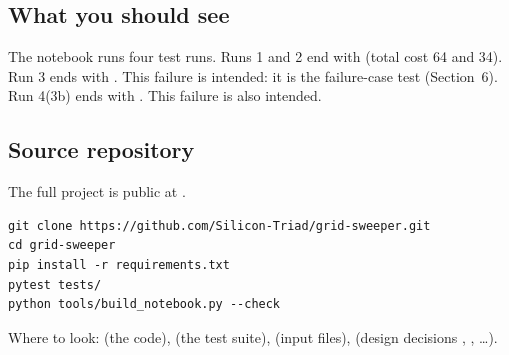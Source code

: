 \subsection{What you should see}
The notebook runs four test runs. Runs 1 and 2 end with  (total cost
64 and 34). Run 3 ends with .
This failure is intended: it is the failure-case test (Section~6).
Run 4(3b) ends with . This failure is also intended.

\subsection{Source repository}
The full project is public at .
\begin{Verbatim}[frame=single,fontsize=\small]
git clone https://github.com/Silicon-Triad/grid-sweeper.git
cd grid-sweeper
pip install -r requirements.txt
pytest tests/
python tools/build_notebook.py --check
\end{Verbatim}
Where to look:  (the code),  (the test suite),  (input
files),  (design decisions , , \dots).
